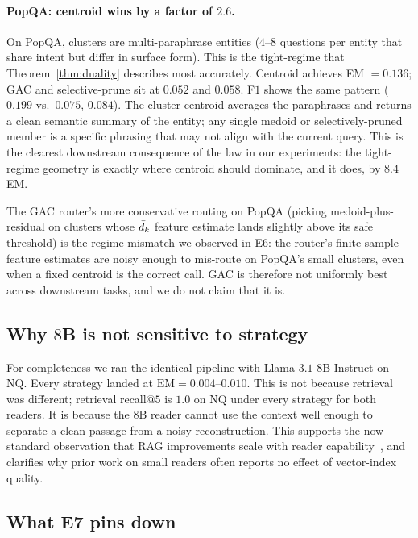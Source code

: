 \paragraph{PopQA: centroid wins by a factor of $2.6$.} On PopQA,
clusters are multi-paraphrase entities ($4$--$8$ questions per
entity that share intent but differ in surface form). This is the
tight-regime that Theorem~\ref{thm:duality} describes most
accurately. Centroid achieves EM $= 0.136$; GAC and selective-prune
sit at $0.052$ and $0.058$. F$1$ shows the same pattern
($0.199$ vs.\ $0.075$, $0.084$). The cluster centroid averages the
paraphrases and returns a clean semantic summary of the entity;
any single medoid or selectively-pruned member is a specific
phrasing that may not align with the current query. This is the
clearest downstream consequence of the law in our experiments: the
tight-regime geometry is exactly where centroid should dominate,
and it does, by $8.4$ EM.

The GAC router's more conservative routing on PopQA (picking
medoid-plus-residual on clusters whose $\bar{d}_k$ feature estimate
lands slightly above its safe threshold) is the regime mismatch
we observed in E6: the router's finite-sample feature estimates
are noisy enough to mis-route on PopQA's small clusters, even when
a fixed centroid is the correct call. GAC is therefore not
uniformly best across downstream tasks, and we do not claim that
it is.

\subsection{Why $8$B is not sensitive to strategy}
\label{sec:e7:8b-ref}

For completeness we ran the identical pipeline with
Llama-$3.1$-$8$B-Instruct on NQ. Every strategy landed at
$\mathrm{EM} = 0.004$--$0.010$. This is not because retrieval was
different; retrieval recall@$5$ is $1.0$ on NQ under every strategy
for both readers. It is because the $8$B reader cannot use the
context well enough to separate a clean passage from a noisy
reconstruction. This supports the now-standard observation that
RAG improvements scale with reader capability~\cite{izacardAtlas2023,
borgeaud2022retro}, and clarifies why prior work on small readers
often reports no effect of vector-index quality.

\subsection{What E7 pins down}
\label{sec:e7:limits}

